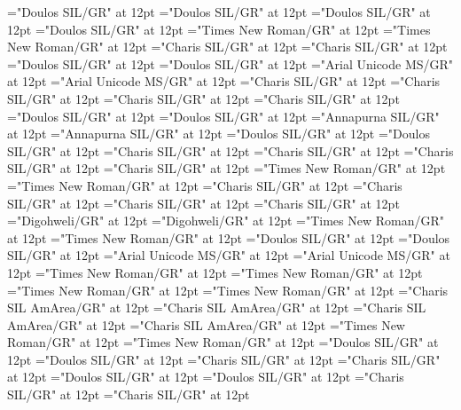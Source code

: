\documentclass[a4paper]{article}
\begin{document}
\pagestyle{plain}
\sloppy
\setlength{\parfillskip}{0pt plus 1fil}
\font\divbfyfonipa="Doulos SIL/GR" at 12pt
\font\spanbfyfonipa="Doulos SIL/GR" at 12pt
\font\divbgdfonipa="Doulos SIL/GR" at 12pt
\font\spanbgdfonipa="Doulos SIL/GR" at 12pt
\font\divbgd="Times New Roman/GR" at 12pt
\font\spanbgd="Times New Roman/GR" at 12pt
\font\divbggLatnIN="Charis SIL/GR" at 12pt
\font\spanbggLatnIN="Charis SIL/GR" at 12pt
\font\divbgqfonipaxetic="Doulos SIL/GR" at 12pt
\font\spanbgqfonipaxetic="Doulos SIL/GR" at 12pt
\font\divbgq="Arial Unicode MS/GR" at 12pt
\font\spanbgq="Arial Unicode MS/GR" at 12pt
\font\divbiVufonipaxemic="Charis SIL/GR" at 12pt
\font\spanbiVufonipaxemic="Charis SIL/GR" at 12pt
\font\divbn="Charis SIL/GR" at 12pt
\font\spanbn="Charis SIL/GR" at 12pt
\font\divbrafonipaxetic="Doulos SIL/GR" at 12pt
\font\spanbrafonipaxetic="Doulos SIL/GR" at 12pt
\font\divbra="Annapurna SIL/GR" at 12pt
\font\spanbra="Annapurna SIL/GR" at 12pt
\font\divbzhfonipa="Doulos SIL/GR" at 12pt
\font\spanbzhfonipa="Doulos SIL/GR" at 12pt
\font\divbzh="Charis SIL/GR" at 12pt
\font\spanbzh="Charis SIL/GR" at 12pt
\font\divchrfonipa="Charis SIL/GR" at 12pt
\font\spanchrfonipa="Charis SIL/GR" at 12pt
\font\divchrQMxsp="Times New Roman/GR" at 12pt
\font\spanchrQMxsp="Times New Roman/GR" at 12pt
\font\divchrxacc="Charis SIL/GR" at 12pt
\font\spanchrxacc="Charis SIL/GR" at 12pt
\font\divchrZxxxQMxspaudio="Charis SIL/GR" at 12pt
\font\spanchrZxxxQMxspaudio="Charis SIL/GR" at 12pt
\font\divchr="Digohweli/GR" at 12pt
\font\spanchr="Digohweli/GR" at 12pt
\font\divde="Times New Roman/GR" at 12pt
\font\spande="Times New Roman/GR" at 12pt
\font\divdhdfonipa="Doulos SIL/GR" at 12pt
\font\spandhdfonipa="Doulos SIL/GR" at 12pt
\font\divdhd="Arial Unicode MS/GR" at 12pt
\font\spandhd="Arial Unicode MS/GR" at 12pt
\font\divenQaaaxScie="Times New Roman/GR" at 12pt
\font\spanenQaaaxScie="Times New Roman/GR" at 12pt
\font\diven="Times New Roman/GR" at 12pt
\font\spanen="Times New Roman/GR" at 12pt
\font\divesaab="Charis SIL AmArea/GR" at 12pt
\font\spanesaab="Charis SIL AmArea/GR" at 12pt
\font\dives="Charis SIL AmArea/GR" at 12pt
\font\spanes="Charis SIL AmArea/GR" at 12pt
\font\divfa="Times New Roman/GR" at 12pt
\font\spanfa="Times New Roman/GR" at 12pt
\font\divflrQaaaxtone="Doulos SIL/GR" at 12pt
\font\spanflrQaaaxtone="Doulos SIL/GR" at 12pt
\font\divflrZxxxxaudio="Charis SIL/GR" at 12pt
\font\spanflrZxxxxaudio="Charis SIL/GR" at 12pt
\font\divflr="Doulos SIL/GR" at 12pt
\font\spanflr="Doulos SIL/GR" at 12pt
\font\divfrZxxxxaudio="Charis SIL/GR" at 12pt
\font\spanfrZxxxxaudio="Charis SIL/GR" at 12pt
\end{document}
